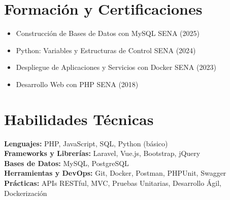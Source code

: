 \documentclass[10.5pt,letterpaper]{article}
\begin{document}
	\section*{Formación y Certificaciones}
	\begin{itemize}
		\item Construcción de Bases de Datos con MySQL \hfill SENA (2025)
		\item Python: Variables y Estructuras de Control \hfill SENA (2024)
		\item Despliegue de Aplicaciones y Servicios con Docker \hfill SENA (2023)
		\item Desarrollo Web con PHP \hfill SENA (2018)
	\end{itemize}
	
	\section*{Habilidades Técnicas}
	\textbf{Lenguajes:} PHP, JavaScript, SQL, Python (básico)\\
	\textbf{Frameworks y Librerías:} Laravel, Vue.js, Bootstrap, jQuery\\
	\textbf{Bases de Datos:} MySQL, PostgreSQL\\
	\textbf{Herramientas y DevOps:} Git, Docker, Postman, PHPUnit, Swagger\\
	\textbf{Prácticas:} APIs RESTful, MVC, Pruebas Unitarias, Desarrollo Ágil, Dockerización
	
\end{document}
